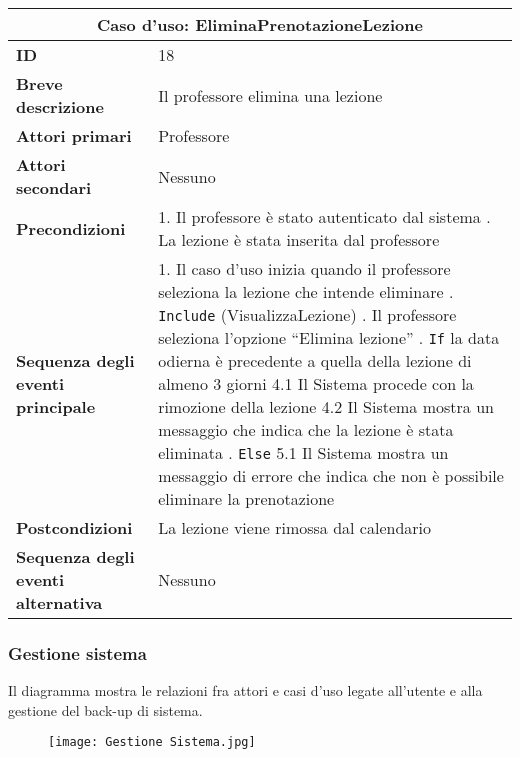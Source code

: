 \documentclass[11pt,a4paper]{report}
\begin{document}
\begin{table}[h!]
\centering
\renewcommand{\arraystretch}{1.3}
\begin{tabular}{|p{4.2cm}|p{10.2cm}|}
\hline
\multicolumn{2}{|c|}{\textbf{Caso d’uso: EliminaPrenotazioneLezione}} \\ \hline
\textbf{ID} & 18 \\ \hline
\textbf{Breve descrizione} & Il professore elimina una lezione \\ \hline
\textbf{Attori primari} & Professore \\ \hline
\textbf{Attori secondari} & Nessuno \\ \hline
\textbf{Precondizioni} &
1. Il professore è stato autenticato dal sistema \newline
2. La lezione è stata inserita dal professore \\ \hline
\textbf{Sequenza degli eventi principale} &
1. Il caso d’uso inizia quando il professore seleziona la lezione che intende eliminare \newline
2. \texttt{Include} (VisualizzaLezione) \newline
3. Il professore seleziona l’opzione “Elimina lezione” \newline
4. \texttt{If} la data odierna è precedente a quella della lezione di almeno 3 giorni \newline
\hspace*{0.5cm} 4.1 Il Sistema procede con la rimozione della lezione \newline
\hspace*{0.5cm} 4.2 Il Sistema mostra un messaggio che indica che la lezione è stata eliminata \newline
5. \texttt{Else} \newline
\hspace*{0.5cm} 5.1 Il Sistema mostra un messaggio di errore che indica che non è possibile eliminare la prenotazione \\ \hline
\textbf{Postcondizioni} & La lezione viene rimossa dal calendario \\ \hline
\textbf{Sequenza degli eventi alternativa} & Nessuno \\ \hline
\end{tabular}
\end{table}

\newpage

\subsubsection{Gestione sistema}
Il diagramma mostra le relazioni fra attori e casi d'uso legate all'utente e alla gestione del back-up di sistema. \\
\begin{figure}[h!]
  \centering
\texttt{[image: Gestione Sistema.jpg]}
\end{figure}
\newpage
\end{document}
